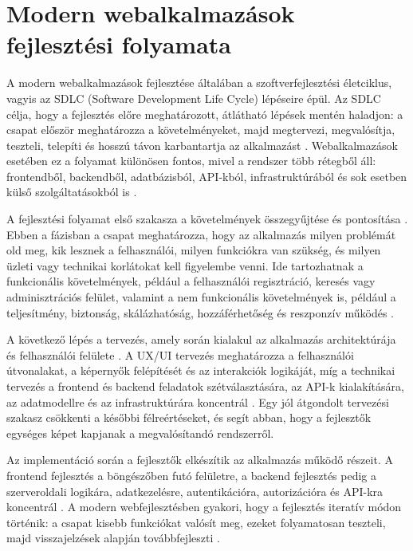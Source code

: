 \section{Modern webalkalmazások fejlesztési folyamata}

A modern webalkalmazások fejlesztése általában a szoftverfejlesztési életciklus, vagyis az SDLC (Software Development Life Cycle) lépéseire épül. Az SDLC célja, hogy a fejlesztés előre meghatározott, átlátható lépések mentén haladjon: a csapat először meghatározza a követelményeket, majd megtervezi, megvalósítja, teszteli, telepíti és hosszú távon karbantartja az alkalmazást \cite{ibmSdlc}. Webalkalmazások esetében ez a folyamat különösen fontos, mivel a rendszer több rétegből áll: frontendből, backendből, adatbázisból, API-kból, infrastruktúrából és sok esetben külső szolgáltatásokból is \cite{mdnClientServerOverview,mdnServerSideIntro}.

A fejlesztési folyamat első szakasza a követelmények összegyűjtése és pontosítása \cite{isoIecIeee29148Requirements}. Ebben a fázisban a csapat meghatározza, hogy az alkalmazás milyen problémát old meg, kik lesznek a felhasználói, milyen funkciókra van szükség, és milyen üzleti vagy technikai korlátokat kell figyelembe venni. Ide tartozhatnak a funkcionális követelmények, például a felhasználói regisztráció, keresés vagy adminisztrációs felület, valamint a nem funkcionális követelmények is, például a teljesítmény, biztonság, skálázhatóság, hozzáférhetőség és reszponzív működés \cite{isoIec25010ProductQuality,w3cWaiAccessibilityIntro}.

A következő lépés a tervezés, amely során kialakul az alkalmazás architektúrája és felhasználói felülete \cite{isoIecIeee42010Architecture,nielsenNorman1998ux}. A UX/UI tervezés meghatározza a felhasználói útvonalakat, a képernyők felépítését és az interakciók logikáját, míg a technikai tervezés a frontend és backend feladatok szétválasztására, az API-k kialakítására, az adatmodellre és az infrastruktúrára koncentrál \cite{mdnClientServerOverview}. Egy jól átgondolt tervezési szakasz csökkenti a későbbi félreértéseket, és segít abban, hogy a fejlesztők egységes képet kapjanak a megvalósítandó rendszerről.

Az implementáció során a fejlesztők elkészítik az alkalmazás működő részeit. A frontend fejlesztés a böngészőben futó felületre, a backend fejlesztés pedig a szerveroldali logikára, adatkezelésre, autentikációra, autorizációra és API-kra koncentrál \cite{mdnWebStandardsModel,mdnServerSideIntro}. A modern webfejlesztésben gyakori, hogy a fejlesztés iteratív módon történik: a csapat kisebb funkciókat valósít meg, ezeket folyamatosan teszteli, majd visszajelzések alapján továbbfejleszti \cite{agileManifesto2001}.

